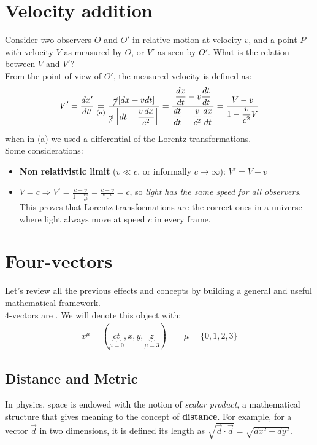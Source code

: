 \documentclass[../template.tex]{subfiles}
\begin{document}
\section{Velocity addition}
Consider two observers $O$ and $O'$ in relative motion at velocity $v$, and a point $P$ with velocity $V$ as measured by $O$, or $V'$ as seen by $O'$. What is the relation between $V$ and $V'$?\\

From the point of view of $O'$, the measured velocity is defined as:
\begin{align*}
\displaystyle V' = \frac{dx'}{dt'} \underset{(a)}{=} \frac{\cancel{\gamma} [dx - v dt]}{\displaystyle \cancel{\gamma} \left[dt - \frac{v\,dx}{c^2}\right]} = \frac{\displaystyle \frac{dx}{dt}-v\frac{dt}{dt}}{\displaystyle \frac{dt}{dt}-\frac{v}{c^2}\frac{dx}{dt}} = \frac{V-v}{\displaystyle 1-\frac{v}{c^2}V}
\end{align*}
when in (a) we used a differential of the Lorentz transformations.\\
Some considerations:
\begin{itemize}
\item \textbf{Non relativistic limit} ($v\ll c$, or informally $c\to \infty$): $V'=V-v$
\item $V=c \Rightarrow V' = \displaystyle \frac{c-v}{1-\frac{vc}{c^2}} = \frac{c-v}{\frac{c-v}{c}} = c$, so \textit{light has the same speed for all observers}. This proves that Lorentz transformations are the correct ones in a universe where light always move at speed $c$ in every frame.
\end{itemize}

\section{Four-vectors}
Let's review all the previous effects and concepts by building a general and useful mathematical framework.\\

$4$-vectors are . We will denote this object with:
\begin{align*}
x^\mu = (\underbrace{ct}_{\mu=0}, x, y, \underbrace{z}_{\mu=3})\qquad \mu = \{0,1,2,3\}
\end{align*}

\subsection{Distance and Metric}
In physics, space is endowed with the notion of \textit{scalar product}, a mathematical structure that gives meaning to the concept of \textbf{distance}. For example, for a vector $\vec{d}$ in two dimensions, it is defined its length as $\sqrt{\vec{d}\cdot \vec{d}} = \sqrt{dx^2 + dy^2}$.\\
\end{document}
